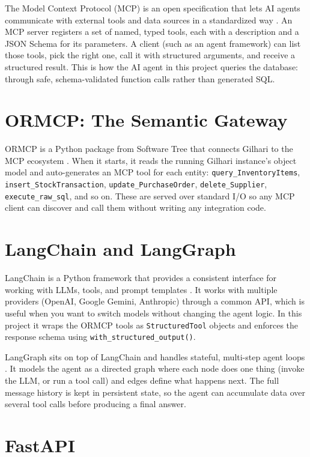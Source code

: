 \documentclass{book}
\begin{document}
The Model Context Protocol (MCP) is an open specification that lets AI agents communicate with external tools and data sources in a standardized way \cite{mcp}. An MCP server registers a set of named, typed tools, each with a description and a JSON Schema for its parameters. A client (such as an agent framework) can list those tools, pick the right one, call it with structured arguments, and receive a structured result. This is how the AI agent in this project queries the database: through safe, schema-validated function calls rather than generated SQL.

\section{ORMCP: The Semantic Gateway}

ORMCP is a Python package from Software Tree that connects Gilhari to the MCP ecosystem \cite{ormcp}. When it starts, it reads the running Gilhari instance's object model and auto-generates an MCP tool for each entity: \texttt{query\_InventoryItems}, \texttt{insert\_StockTransaction}, \texttt{update\_PurchaseOrder}, \texttt{delete\_Supplier}, \texttt{execute\_raw\_sql}, and so on. These are served over standard I/O so any MCP client can discover and call them without writing any integration code.

\section{LangChain and LangGraph}

LangChain is a Python framework that provides a consistent interface for working with LLMs, tools, and prompt templates \cite{langchain}. It works with multiple providers (OpenAI, Google Gemini, Anthropic) through a common API, which is useful when you want to switch models without changing the agent logic. In this project it wraps the ORMCP tools as \texttt{StructuredTool} objects and enforces the response schema using \texttt{with\_structured\_output()}.

LangGraph sits on top of LangChain and handles stateful, multi-step agent loops \cite{langgraph}. It models the agent as a directed graph where each node does one thing (invoke the LLM, or run a tool call) and edges define what happens next. The full message history is kept in persistent state, so the agent can accumulate data over several tool calls before producing a final answer.

\section{FastAPI}
\end{document}
